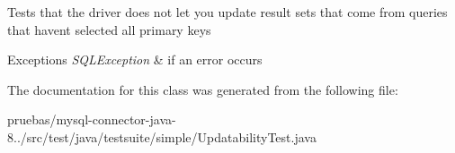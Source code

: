 Tests that the driver does not let you update result sets that come from queries that haven\textquotesingle{}t selected all primary keys


\begin{DoxyExceptions}{Exceptions}
{\em S\+Q\+L\+Exception} & if an error occurs \\
\hline
\end{DoxyExceptions}


The documentation for this class was generated from the following file\+:\begin{DoxyCompactItemize}
\item 
pruebas/mysql-\/connector-\/java-\/8../src/test/java/testsuite/simple/Updatability\+Test.\+java\end{DoxyCompactItemize}

